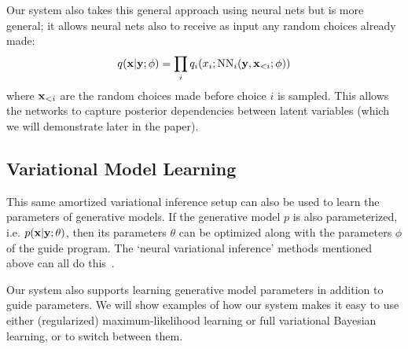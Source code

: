 Our system also takes this general approach using neural nets but is more general; it allows neural nets also to receive as input any random choices already made:
\begin{equation*}
q(\mathbf{x} | \mathbf{y} ; \phi) = \prod_i q_i(x_i ; \text{NN}_i(\mathbf{y}, \mathbf{x}_{<i} ; \phi))
\end{equation*}
where $\mathbf{x}_{<i}$ are the random choices made before choice $i$ is sampled. This allows the networks to capture posterior dependencies between latent variables (which we will demonstrate later in the paper).

\subsection{Variational Model Learning}

This same amortized variational inference setup can also be used to learn the parameters of generative models. If the generative model $p$ is also parameterized, i.e. $p(\mathbf{x} | \mathbf{y} ; \theta)$, then its parameters $\theta$ can be optimized along with the parameters $\phi$ of the guide program.
The `neural variational inference' methods mentioned above can all do this~\cite{NVIL,DLGM,AEVB}.

Our system also supports learning generative model parameters in addition to guide parameters.
We will show examples of how our system makes it easy to use either (regularized) maximum-likelihood learning or full variational Bayesian learning, or to switch between them.

